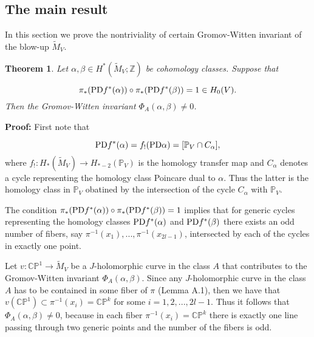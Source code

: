 \documentclass[a4paper,14pt]{article}
\newcommand{\B}[1]{\mathbb #1}
\newcommand{\al}{{\alpha}}
\newcommand{\be}{{\beta}}
\newcommand{\qed}{\rightline {$\Box $}}
\newcommand{\blowMV}{\widetilde {M}_V}
\newcommand{\cp}{{\B C\B P}}
\newcommand{\PD }{\hbox {\text {PD}}}
\newcommand{\pf}{\NI {\bf Proof: }}
\newcommand{\BS}{{\bigskip}}
\newcommand{\NI}{{\noindent}}
\newtheorem{thm}[theorem]{Theorem}
\numberwithin{equation}{section}
\begin{document}
\qed

\BS






































\subsection{ The main result}


In this section we prove the nontriviality of certain
Gromov-Witten invariant of the blow-up $\blowMV$.




\begin{thm} \label{AT:main}
Let $\al,\be\in H^*(\blowMV ;\B Z )$ be cohomology classes.
Suppose that


{\em
$$\pi _*(\PD f^*(\al )) \circ \pi _*(\PD f^*(\be )) = 1 \in H_0(V).$$}
Then the Gromov-Witten invariant
$\Phi _A(\al,\be) \neq 0$.
\end{thm}




\pf
First note that

$$\PD f^*(\al ) = f_! (\PD \al ) =
[\B P_V \cap C_{\al }],$$
where
$f_!:H_*(\blowMV) \to H_{*-2}(\B P_V)$ is the homology
transfer map and $C_{\al }$ denotes a cycle representing
the homology class Poincare dual to $\al $.
Thus the latter is the homology class in $\B P_V$ obatined by
the intersection of the cycle $C_{\al }$ with
$\B P_V$.

The condition
$\pi _*(\PD f^*(\al )) \circ \pi _*(\PD f^*(\be )) = 1$
implies that for generic cycles representing the
homology classes $\PD f^*(\al )$ and $\PD f^*(\be )$
there exists an odd number of fibers, say
$\pi ^{-1}(x_1),...,\pi ^{-1}(x_{2l-1})$,
intersected by each of the cycles in exactly one
point.

Let $v:\cp ^1\to \blowMV $ be a $J$-holomorphic
curve in the class $A$ that contributes to the Gromov-Witten
invariant $\Phi _A(\al , \be )$.
Since any $J$-holomorphic curve
in the class $A$ has to be contained in some fiber
of $\pi $ (Lemma A.1), then we have that
$v(\cp ^1) \subset \pi ^{-1}(x_i)=\cp^k$ for some
$i=1,2,...,2l-1$.
Thus it follows that $\Phi _A(\al ,\be)\neq 0$, because
in each fiber $\pi ^{-1}(x_i)=\cp ^k$ there is exactly
one line passing through  two generic points and the
number of the fibers is odd.
\end{document}
